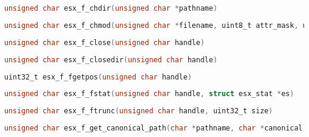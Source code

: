 \documentclass[11pt]{book}
\def\lthtmlcheckvsize{\ifdim\ht\sizebox<\vsize 
  \ifdim\wd\sizebox<\hsize\expandafter\hfill\fi \expandafter\vfill
  \else\expandafter\vss\fi}%
\begin{document}
{\newpage\clearpage
{}%
\begin{lstlisting}[language=C]
unsigned char esx_f_chdir(unsigned char *pathname)
\end{lstlisting}%
\lthtmlfigureZ
\lthtmlcheckvsize\clearpage}

{\newpage\clearpage
{}%
\begin{lstlisting}[language=C]
unsigned char esx_f_chmod(unsigned char *filename, uint8_t attr_mask, uint8_t attr)
\end{lstlisting}%
\lthtmlfigureZ
\lthtmlcheckvsize\clearpage}

{\newpage\clearpage
{}%
\begin{lstlisting}[language=C]
unsigned char esx_f_close(unsigned char handle)
\end{lstlisting}%
\lthtmlfigureZ
\lthtmlcheckvsize\clearpage}

{\newpage\clearpage
{}%
\begin{lstlisting}[language=C]
unsigned char esx_f_closedir(unsigned char handle)
\end{lstlisting}%
\lthtmlfigureZ
\lthtmlcheckvsize\clearpage}

{\newpage\clearpage
{}%
\begin{lstlisting}[language=C]
uint32_t esx_f_fgetpos(unsigned char handle)
\end{lstlisting}%
\lthtmlfigureZ
\lthtmlcheckvsize\clearpage}

{\newpage\clearpage
{}%
\begin{lstlisting}[language=C]
unsigned char esx_f_fstat(unsigned char handle, struct esx_stat *es)
\end{lstlisting}%
\lthtmlfigureZ
\lthtmlcheckvsize\clearpage}

{\newpage\clearpage
{}%
\begin{lstlisting}[language=C]
unsigned char esx_f_ftrunc(unsigned char handle, uint32_t size)
\end{lstlisting}%
\lthtmlfigureZ
\lthtmlcheckvsize\clearpage}

{\newpage\clearpage
{}%
\begin{lstlisting}[language=C]
unsigned char esx_f_get_canonical_path(char *pathname, char *canonical)
\end{lstlisting}%
\lthtmlfigureZ
\lthtmlcheckvsize\clearpage}
\end{document}
